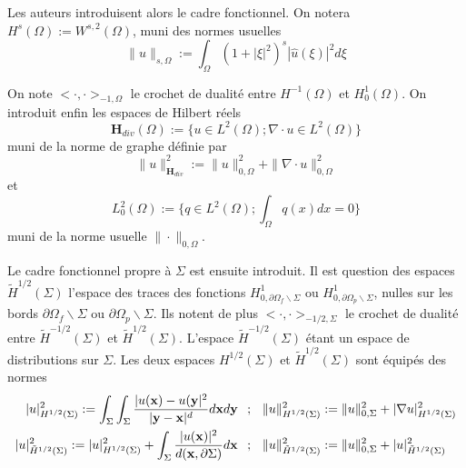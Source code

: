 Les auteurs introduisent alors le cadre fonctionnel. On notera $H^{s}(\Omega) := W^{s, 2}(\Omega)$, muni des normes usuelles
$$ \| u \|_{s, \Omega} := \int_{\Omega} (1 + |\xi|^2)^s |\hat{u}(\xi)|^2 d\xi $$

On note $ < \cdot, \cdot >_{-1, \Omega}$ le crochet de dualité entre $H^{-1}(\Omega)$ et $H^{1}_{0}(\Omega)$. On introduit enfin les espaces de Hilbert réels $$ \mathbf{H}_{div}(\Omega) := \{ u \in L^2(\Omega) ; \nabla \cdot u \in L^2(\Omega) \} $$ muni de la norme de graphe définie par $$ \| u \|^2_{\mathbf{H}_{div}} := \| u \|^2_{0, \Omega} + \| \nabla \cdot u \|^2_{0, \Omega} $$ et $$ L^2_0(\Omega) := \{ q \in L^2(\Omega) ; \int_{\Omega} q(x) dx = 0 \} $$ muni de la norme usuelle $\| \cdot \|_{0, \Omega}$.

Le cadre fonctionnel propre à $\Sigma$ est ensuite introduit. Il est question des espaces $\tilde{H}^{1/2}(\Sigma)$ l'espace des traces des fonctions $H^1_{0, \partial \Omega_f \backslash \Sigma}$ ou $H^1_{0, \partial \Omega_p \backslash \Sigma}$, nulles sur les bords $\partial \Omega_f \backslash \Sigma$ ou $\partial \Omega_p \backslash \Sigma$. Ils notent de plus $< \cdot, \cdot >_{-1/2, \Sigma}$ le crochet de dualité entre $\tilde{H}^{-1/2}(\Sigma)$ et $\tilde{H}^{1/2}(\Sigma)$. L'espace $\tilde{H}^{-1/2}(\Sigma)$ étant un espace de distributions sur $\Sigma$. Les deux espaces $H^{1/2}(\Sigma)$ et $\tilde{H}^{1/2}(\Sigma)$ sont équipés des normes
\begin{align*}
    |u|^2_{H^{1/2}(\Sigma)} := \int_{\Sigma} \int_{\Sigma} \frac{|u(\mathbf{x}) - u(\mathbf{y}|^2}{|\mathbf{y} - \mathbf{x}|^d} d\mathbf{x} d\mathbf{y} & \hspace{7.5pt} ; \hspace{7.5pt} \| u \|^2_{H^{1/2}(\Sigma)} := \| u \|^2_{0, \Sigma} + | \nabla u |^2_{H^{1/2}(\Sigma)} \\
    |u|^2_{\tilde{H}^{1/2}(\Sigma)} := |u|^2_{H^{1/2}(\Sigma)} + \int_{\Sigma} \frac{|u(\mathbf{x})|^2}{d(\mathbf{x}, \partial \Sigma)} d\mathbf{x} & \hspace{7.5pt} ; \hspace{7.5pt} \| u \|^2_{\tilde{H}^{1/2}(\Sigma)} := \| u \|^2_{0, \Sigma} + | u |^2_{\tilde{H}^{1/2}(\Sigma)}
\end{align*}
